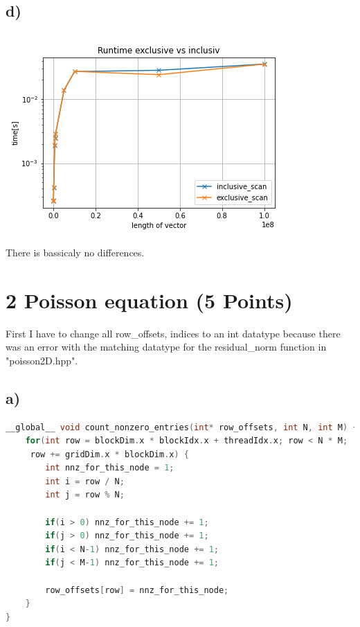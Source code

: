 \documentclass[11pt,a4paper]{article}
\begin{document}
\subsection*{d)}
\begin{center}
	
	\begin{minipage}[t]{0.70\textwidth}
		\includegraphics[width=\textwidth]{Bilder/runtime_excl_vs_inclu}
	\end{minipage}
	
\end{center}
There is bassicaly no differences.
\newpage
\section*{2 Poisson equation (5 Points)}
First I have to change all row\_offsets, indices to an int datatype because there was an error with the matching datatype for the residual\_norm function in "poisson2D.hpp".
\subsection*{a)}
\begin{lstlisting}[language=C++, caption={kernel for serching for zeros)}]
__global__ void count_nonzero_entries(int* row_offsets, int N, int M) {
	for(int row = blockDim.x * blockIdx.x + threadIdx.x; row < N * M;
	 row += gridDim.x * blockDim.x) {
		int nnz_for_this_node = 1;
		int i = row / N;
		int j = row % N;
		
		if(i > 0) nnz_for_this_node += 1;
		if(j > 0) nnz_for_this_node += 1;
		if(i < N-1) nnz_for_this_node += 1;
		if(j < M-1) nnz_for_this_node += 1;
		
		row_offsets[row] = nnz_for_this_node;
	}
}
\end{lstlisting}
\end{document}
